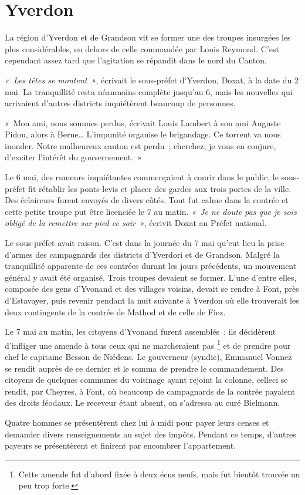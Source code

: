 \documentclass[french,twoside]{book} %
\newenvironment{quoteblock}%
  {\begin{quoting}}
  {\end{quoting}}
\newenvironment{quotebar}{%
    \def\FrameCommand{{\color{rubric!10!}\vrule width 0.5em} \hspace{0.9em}}%
    \def\OuterFrameSep{\itemsep} %
    \MakeFramed {\advance\hsize-\width \FrameRestore}
  }%
  {%
    \endMakeFramed
  }
\renewenvironment{quoteblock}%
  {%
    \savenotes
    \setstretch{0.9}
    \normalfont
    \begin{quotebar}
  }
  {%
    \end{quotebar}
    \spewnotes
  }
\begin{document}
\section[Yverdon]{Yverdon}
\noindent La région d’Yverdon et de Grandson vit se former une des troupes insurgées les plus considérables, en dehors de celle commandée par Louis Reymond. C’est cependant assez tard que l’agitation se répandit dans le nord du Canton.\par
\emph{« Les têtes se montent »}, écrivait le sous-préfet d’Yverdon, Doxat, à la date du 2 mai. La tranquillité resta néanmoins complète jusqu’au 6, mais les nouvelles qui arrivaient d’autres districts inquiétèrent beaucoup de personnes.\par

\begin{quoteblock}
 \noindent « Mon ami, nous sommes perdus, écrivait Louis Lambert à son ami Auguste Pidou, alors à Berne… L’impunité organise le brigandage. Ce torrent va nous inonder. Notre malheureux canton est perdu ; cherchez, je vous en conjure, d’exciter l’intérêt du gouvernement. »
 \end{quoteblock}

\noindent Le 6 mai, des rumeurs inquiétantes commençaient à courir dans le public, le sous-préfet fit rétablir les ponts-levis et placer des gardes aux trois portes de la ville. Des éclaireurs furent envoyés de divers côtés. Tout fut calme dans la contrée et cette petite troupe put être licenciée le 7 au matin. \emph{« Je ne doute pas que je sois obligé de la remettre sur pied ce soir »}, écrivit Doxat au Préfet national.\par
Le sous-préfet avait raison. C’est dans la journée du 7 mai qu’eut lieu la prise d’armes des campagnards des districts d’Yverdori et de Grandson. Malgré la tranquillité apparente de ces contrées durant les jours précédents, un mouvement général y avait été organisé. Trois troupes devaient se former. L’une d’entre elles, composée des gens d’Yvonand et des villages voisins, devait se rendre à Font, près d’Estavayer, puis revenir pendant la nuit suivante à Yverdon où elle trouverait les deux contingents de la contrée de Mathod et de celle de Fiez.\par
Le 7 mai au matin, les citoyens d’Yvonand furent assemblés ; ils décidèrent d’infliger une amende à tous ceux qui ne marcheraient pas \footnote{Cette amende fut d’abord fixée à deux écus neufs, mais fut bientôt trouvée un peu trop forte.} et de prendre pour chef le capitaine Besson de Niédens. Le gouverneur (syndic), Emmanuel Vonnez se rendit auprès de ce dernier et le somma de prendre le commandement. Des citoyens de quelques communes du voisinage ayant rejoint la colonne, celleci se rendit, par Cheyres, à Font, où beaucoup de campagnards de la contrée payaient des droits féodaux. Le receveur étant absent, on s’adressa au curé Bielmann.\par
Quatre hommes se présentèrent chez lui à midi pour payer leurs censes et demander divers renseignements au sujet des impôts. Pendant ce temps, d’autres payeurs se présentèrent et finirent par encombrer l’appartement.\par
\end{document}
